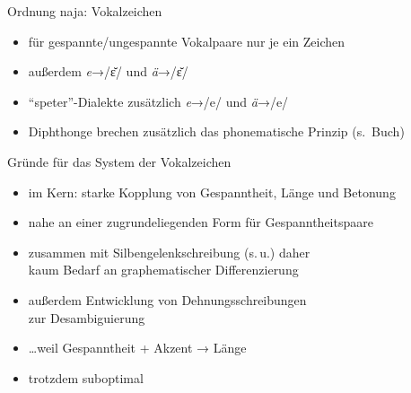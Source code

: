 \begin{frame}
  {Ordnung naja: Vokalzeichen}
  \pause
  \centering
    \Zeile
    \pause
    \begin{itemize}[<+->]
      \item \alert{für gespannte\slash ungespannte Vokalpaare nur je ein Zeichen}
      \item außerdem \textit{e}→/ɛ̆/ und \textit{ä}→/ɛ̆/
      \item "`speter"'-Dialekte zusätzlich \textit{e}→/e/ und \textit{ä}→/e/
        \Halbzeile
      \item \alert{Diphthonge} brechen zusätzlich das phonematische Prinzip (s.\ Buch)
    \end{itemize}
\end{frame}

\begin{frame}
  {Gründe für das System der Vokalzeichen}
  \pause
  \begin{itemize}[<+->]
    \item im Kern: \alert{starke Kopplung von Gespanntheit, Länge und Betonung}
    \item nahe an \alert{einer zugrundeliegenden Form} für Gespanntheitspaare
    \item zusammen mit \alert{Silbengelenkschreibung} (s.\,u.) daher\\
      kaum Bedarf an graphematischer Differenzierung
      \Halbzeile
    \item außerdem Entwicklung von \alert{Dehnungsschreibungen}\\
      zur Desambiguierung
    \item \ldots weil \alert{Gespanntheit + Akzent → Länge}
      \Halbzeile
    \item trotzdem suboptimal
  \end{itemize}
\end{frame}


